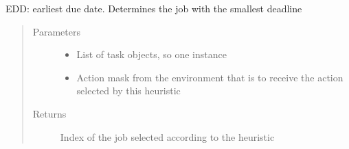 \documentclass[letterpaper,10pt,english]{sphinxmanual}
\begin{document}
\begin{fulllineitems}
\label{\detokenize{agents.heuristic:agents.heuristic.heuristic_agent.edd}}
\sphinxAtStartPar
EDD: earliest due date. Determines the job with the smallest deadline
\begin{quote}\begin{description}
\item[{Parameters}] \leavevmode\begin{itemize}
\item {} 
\sphinxAtStartPar
{} \textendash{} List of task objects, so one instance

\item {} 
\sphinxAtStartPar
{} \textendash{} Action mask from the environment that is to receive the action selected by this heuristic

\end{itemize}

\item[{Returns}] \leavevmode
\sphinxAtStartPar
Index of the job selected according to the heuristic

\end{description}\end{quote}

\end{fulllineitems}

\end{document}
